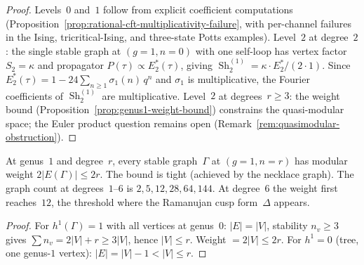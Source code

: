 \begin{proof}
Levels~$0$ and~$1$ follow from explicit coefficient computations
(Proposition~\ref{prop:rational-cft-multiplicativity-failure},
with per-channel failures in the Ising, tricritical-Ising, and
three-state Potts examples).
Level~$2$ at degree~$2$: the single stable graph at $(g{=}1,n{=}0)$
with one self-loop has vertex factor~$S_2 = \kappa$ and
propagator $P(\tau) \propto E_2^*(\tau)$, giving
$\operatorname{Sh}_2^{(1)} = \kappa \cdot E_2^*/(2\cdot 1)$.
Since $E_2^*(\tau) = 1 - 24\sum_{n\ge1}\sigma_1(n)\,q^n$ and
$\sigma_1$ is multiplicative, the Fourier coefficients of
$\operatorname{Sh}_2^{(1)}$ are multiplicative.
Level~$2$ at degrees~$r \ge 3$:
the weight bound (Proposition~\ref{prop:genus1-weight-bound})
constrains the quasi-modular space; the Euler product question
remains open (Remark~\ref{rem:quasimodular-obstruction}).
\end{proof}

\begin{proposition}%
\label{prop:genus1-weight-bound}%
\ClaimStatusProvedHere%
%
At genus~$1$ and degree~$r$, every stable graph~$\Gamma$ at
$(g{=}1, n{=}r)$ has modular weight $2|E(\Gamma)| \le 2r$.
The bound is tight \textup{(}achieved by the necklace
graph\textup{)}. The graph count at degrees~$1$--$6$ is
$2, 5, 12, 28, 64, 144$.
At degree~$6$ the weight first reaches~$12$, the threshold
where the Ramanujan cusp form~$\Delta$ appears.
\end{proposition}

\begin{proof}
For $h^1(\Gamma) = 1$ with all vertices at genus~$0$:
$|E| = |V|$, stability $n_v \ge 3$ gives
$\sum n_v = 2|V| + r \ge 3|V|$, hence $|V| \le r$.
Weight $= 2|V| \le 2r$.
For $h^1 = 0$ (tree, one genus-$1$ vertex):
$|E| = |V| - 1 < |V| \le r$.
\end{proof}

